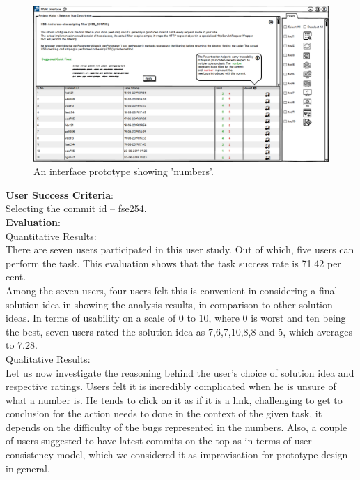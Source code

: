 \begin{figure}[hbt!]
	\centering
	\includegraphics[width=\linewidth]{figures/solution_ideas_snaps/S23_metrics}
	\caption{An interface prototype showing 'numbers'.}
	\label{fig:S23_metrics}
\end{figure}

\textbf{User Success Criteria}: \\

Selecting the commit id – fse254. \\

\textbf{Evaluation}: \\

Quantitative Results: \\

There are seven users participated in this user study. Out of which, five users can perform the task. This evaluation shows that the task success rate is 71.42 per cent. \\

Among the seven users, four users felt this is convenient in considering a final solution idea in showing the analysis results, in comparison to other solution ideas. In terms of usability on a scale of 0 to 10, where 0 is worst and ten being the best, seven users rated the solution idea as 7,6,7,10,8,8 and 5, which averages to 7.28. \\

Qualitative Results: \\

Let us now investigate the reasoning behind the user’s choice of solution idea and respective ratings. Users felt it is incredibly complicated when he is unsure of what a number is. He tends to click on it as if it is a link, challenging to get to conclusion for the action needs to done in the context of the given task, it depends on the difficulty of the bugs represented in the numbers. Also, a couple of users suggested to have latest commits on the top as in terms of user consistency model, which we considered it as improvisation for prototype design in general. \\

